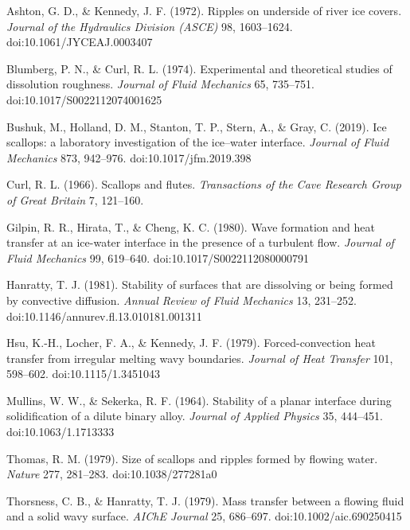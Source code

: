 \documentclass[tc, manuscript]{copernicus}
\begin{document}



\begin{thebibliography}{}
Ashton, G. D., \& Kennedy, J. F. (1972). Ripples on underside of river ice covers. \emph{Journal of the Hydraulics Division (ASCE)} 98, 1603–1624. doi:10.1061/JYCEAJ.0003407

Blumberg, P. N., \& Curl, R. L. (1974). Experimental and theoretical studies of dissolution roughness. \emph{Journal of Fluid Mechanics} 65, 735–751. doi:10.1017/S0022112074001625

Bushuk, M., Holland, D. M., Stanton, T. P., Stern, A., \& Gray, C. (2019). Ice scallops: a laboratory investigation of the ice–water interface. \emph{Journal of Fluid Mechanics} 873, 942–976. doi:10.1017/jfm.2019.398

Curl, R. L. (1966). Scallops and flutes. \emph{Transactions of the Cave Research Group of Great Britain} 7, 121–160.

Gilpin, R. R., Hirata, T., \& Cheng, K. C. (1980). Wave formation and heat transfer at an ice-water interface in the presence of a turbulent flow. \emph{Journal of Fluid Mechanics} 99, 619–640. doi:10.1017/S0022112080000791

Hanratty, T. J. (1981). Stability of surfaces that are dissolving or being formed by convective diffusion. \emph{Annual Review of Fluid Mechanics} 13, 231–252. doi:10.1146/annurev.fl.13.010181.001311

Hsu, K.-H., Locher, F. A., \& Kennedy, J. F. (1979). Forced-convection heat transfer from irregular melting wavy boundaries. \emph{Journal of Heat Transfer} 101, 598–602. doi:10.1115/1.3451043

Mullins, W. W., \& Sekerka, R. F. (1964). Stability of a planar interface during solidification of a dilute binary alloy. \emph{Journal of Applied Physics} 35, 444–451. doi:10.1063/1.1713333

Thomas, R. M. (1979). Size of scallops and ripples formed by flowing water. \emph{Nature} 277, 281–283. doi:10.1038/277281a0

Thorsness, C. B., \& Hanratty, T. J. (1979). Mass transfer between a flowing fluid and a solid wavy surface. \emph{AIChE Journal} 25, 686–697. doi:10.1002/aic.690250415

\end{thebibliography}
\end{document}
